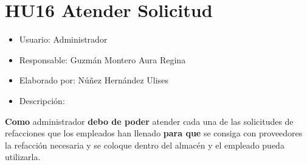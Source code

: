 \section{HU16 Atender Solicitud}
\begin{itemize}
	\item Usuario: Administrador
	\item Responsable: Guzmán Montero Aura Regina
	\item Elaborado por: Núñez Hernández Ulises
	\item Descripción:\\
\end{itemize}

\textbf{Como} administrador \textbf{debo de poder} atender cada una de las solicitudes de refacciones que los empleados han llenado  \textbf{para que} se consiga con proveedores la refacción necesaria y se coloque dentro del almacén y el empleado pueda utilizarla.  